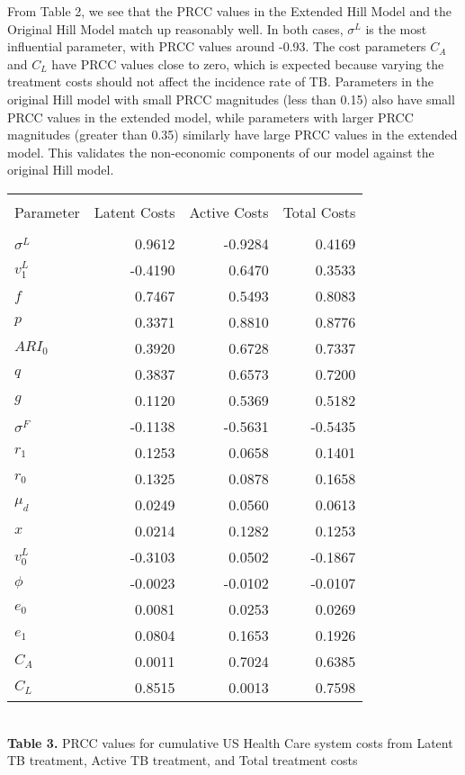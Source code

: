 \documentclass{article}[11pt]
\begin{document}
From Table 2, we see that the PRCC values in the Extended Hill Model and the Original Hill Model match up reasonably well.  In both cases, $\sigma^{L}$ is the most influential parameter, with PRCC values around -0.93.  The cost parameters $C_{A}$ and $C_{L}$ have PRCC values close to zero, which is expected because varying the treatment costs should not affect the incidence rate of TB.  Parameters in the original Hill model with small PRCC magnitudes (less than 0.15) also have small PRCC values in the extended model, while parameters with larger PRCC magnitudes (greater than 0.35) similarly have large PRCC values in the extended model.  This validates the non-economic components of our model against the original Hill model.   \\

\begin{table}[h]
\centering
\begin{tabular}{l r r r}
\hline\hline\\
Parameter & Latent Costs & Active Costs & Total Costs\\ [0.5ex]
\hline\\
$\sigma^{L}$  & 0.9612  & -0.9284 & 0.4169 \\
$v^{L}_{1}$   & -0.4190 & 0.6470  & 0.3533 \\
$f$                 & 0.7467  & 0.5493  & 0.8083 \\
$p$                & 0.3371  & 0.8810  & 0.8776 \\
$ARI_{0}$      & 0.3920  & 0.6728  & 0.7337 \\
$q$                & 0.3837  & 0.6573  & 0.7200 \\
$g$                & 0.1120  & 0.5369  & 0.5182 \\
$\sigma^{F}$ & -0.1138 & -0.5631 &-0.5435 \\
$r_{1}$          & 0.1253 &  0.0658  & 0.1401 \\
$r_{0}$          & 0.1325  & 0.0878  & 0.1658 \\
$\mu_{d}$      & 0.0249 & 0.0560  & 0.0613 \\
$x$                 & 0.0214 & 0.1282  & 0.1253 \\
$v^{L}_{0}$   & -0.3103 & 0.0502  &-0.1867 \\
$\phi$            & -0.0023 & -0.0102 &-0.0107 \\
$e_{0}$          & 0.0081 & 0.0253   & 0.0269 \\
$e_{1}$          & 0.0804 & 0.1653   & 0.1926 \\
$C_{A}$          & 0.0011 & 0.7024   & 0.6385 \\
$C_{L}$           & 0.8515 & 0.0013  & 0.7598 \\ [1ex]
\hline
\end{tabular}\\[1ex]

{\bf Table 3.} PRCC values for cumulative US Health Care system costs from 
Latent TB treatment, Active TB treatment, and Total treatment costs
\end{table}
\end{document}
